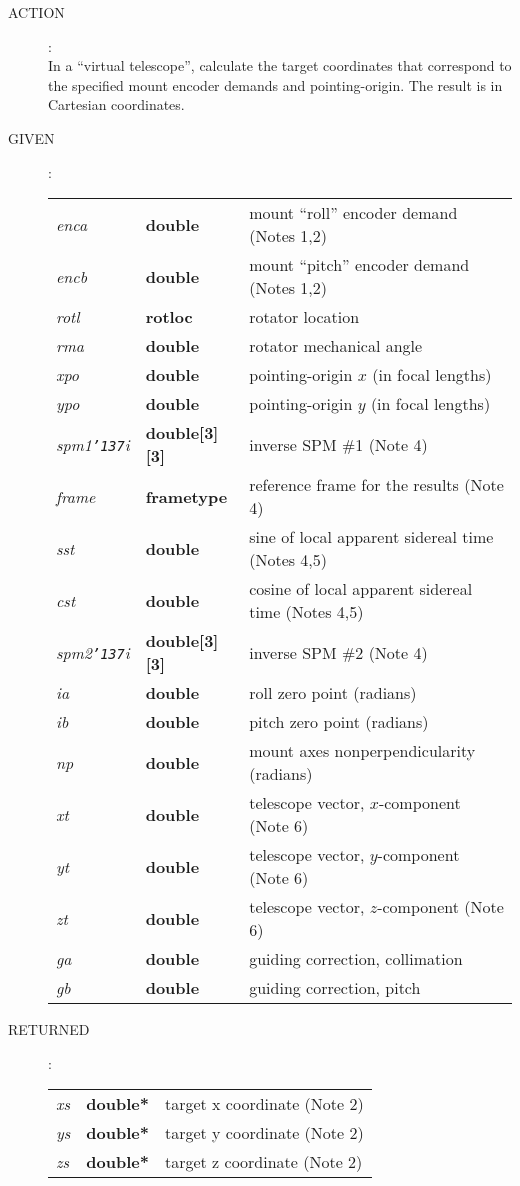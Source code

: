 \documentclass[12pt,fleqn,twoside]{article}
\renewcommand{\_}{{\tt\char'137}}     %
\newcommand{\action}[1]
{
  \goodbreak
  \begin{description}
    \item[ACTION]: \\[0.5ex] \nopagebreak
        #1
  \end{description}
  \vspace{-3ex}
}
\newcommand{\args}[2]
{
  \goodbreak
  \begin{description}
  \item[#1]: \\[1.5ex] \nopagebreak
    \hspace*{-0.9em}
    \begin{tabular}{p{4.5em}p{5.8em}p{23.5em}}
      #2
    \end{tabular}
  \end{description}
  \vspace{-3ex}
}
\newcommand{\spec}[3]
{
  {\em {#1}} & {\bf \mbox{#2}} & {#3}
}
\begin{document}
\action{In a ``virtual telescope'', calculate the target coordinates that
        correspond to the specified mount encoder demands and
        pointing-origin.  The result is in Cartesian coordinates.}
\args{GIVEN}
{
\spec{enca}{double}{mount ``roll'' encoder demand (Notes 1,2) } \\
\spec{encb}{double}{mount ``pitch'' encoder demand (Notes 1,2)} \\
\spec{rotl}{\sc rotloc}{rotator location} \\
\spec{rma}{double}{rotator mechanical angle} \\
\spec{xpo}{double}{pointing-origin $x$ (in focal lengths)} \\
\spec{ypo}{double}{pointing-origin $y$ (in focal lengths)} \\
\spec{spm1\_i}{double[3][3]}{inverse SPM \#1 (Note 4)} \\
\spec{frame}{\sc frametype}{reference frame for the results (Note 4)} \\
\spec{sst}{double}{sine of local apparent sidereal time (Notes 4,5)} \\
\spec{cst}{double}{cosine of local apparent sidereal time (Notes 4,5)} \\
\spec{spm2\_i}{double[3][3]}{inverse SPM \#2 (Note 4)} \\
\spec{ia}{double}{roll zero point (radians) } \\
\spec{ib}{double}{pitch zero point (radians)} \\
\spec{np}{double}{mount axes nonperpendicularity (radians)} \\
\spec{xt}{double}{telescope vector, $x$-component (Note 6)} \\
\spec{yt}{double}{telescope vector, $y$-component (Note 6)} \\
\spec{zt}{double}{telescope vector, $z$-component (Note 6)} \\
\spec{ga}{double}{guiding correction, collimation} \\
\spec{gb}{double}{guiding correction, pitch}
}
\args{RETURNED} {
\spec{xs}{double*}{target x coordinate (Note 2)} \\
\spec{ys}{double*}{target y coordinate (Note 2)} \\
\spec{zs}{double*}{target z coordinate (Note 2)}
}
\end{document}
